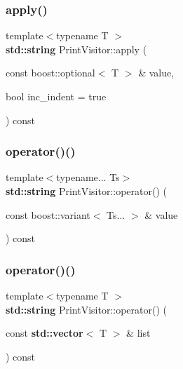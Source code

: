 \subsubsection{\texorpdfstring{apply()}{apply()}\hspace{0.1cm}{\footnotesize\ttfamily [3/3]}}
{\footnotesize\ttfamily template$<$typename T $>$ \\
\textbf{ std\+::string} Print\+Visitor\+::apply (\begin{DoxyParamCaption}\item[{const boost\+::optional$<$ T $>$ \&}]{value,  }\item[{bool}]{inc\+\_\+indent = {\ttfamily true} }\end{DoxyParamCaption}) const\hspace{0.3cm}{\ttfamily [inline]}}

\mbox{\label{struct_print_visitor_aff884e9fac6b8acea4e6608c4fe7eafd}} 
\subsubsection{\texorpdfstring{operator()()}{operator()()}\hspace{0.1cm}{\footnotesize\ttfamily [1/38]}}
{\footnotesize\ttfamily template$<$typename... Ts$>$ \\
\textbf{ std\+::string} Print\+Visitor\+::operator() (\begin{DoxyParamCaption}\item[{const boost\+::variant$<$ Ts... $>$ \&}]{value }\end{DoxyParamCaption}) const\hspace{0.3cm}{\ttfamily [inline]}}

\mbox{\label{struct_print_visitor_ad17a4608e0fce125b756cdbc5860660b}} 
\subsubsection{\texorpdfstring{operator()()}{operator()()}\hspace{0.1cm}{\footnotesize\ttfamily [2/38]}}
{\footnotesize\ttfamily template$<$typename T $>$ \\
\textbf{ std\+::string} Print\+Visitor\+::operator() (\begin{DoxyParamCaption}\item[{const \textbf{ std\+::vector}$<$ T $>$ \&}]{list }\end{DoxyParamCaption}) const\hspace{0.3cm}{\ttfamily [inline]}}

